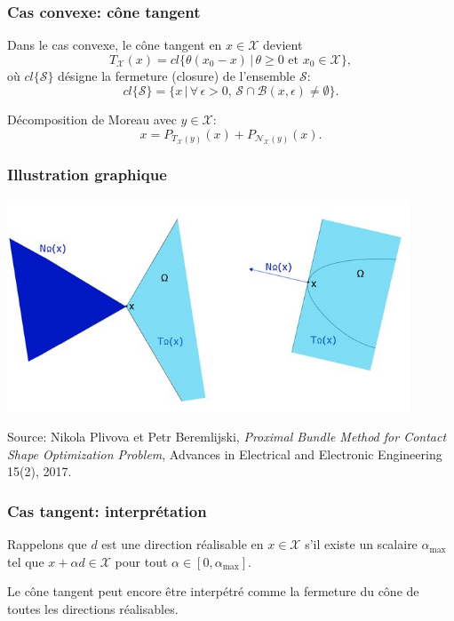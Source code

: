 \documentclass[t,usepdftitle=false]{beamer}
\def\cB{\mathcal{B}}
\def\cN{\mathcal{N}}
\def\cS{\mathcal{S}}
\def\cX{\mathcal{X}}
\begin{document}
\begin{frame}
\frametitle{Cas convexe: cône tangent}

Dans le cas convexe, le cône tangent en $x \in \cX$ devient
$$
T_{\cX}(x) = cl\{ \theta(x_0-x) \,|\, \theta \geq 0 \mbox{ et } x_0 \in \cX \},
$$
où $cl\{\cS\}$ désigne la fermeture (closure) de l'ensemble $\cS$:
$$
cl\{\cS\} = \{ x \,|\, \forall\, \epsilon > 0,\, \cS \cap \cB(x,\epsilon) \ne \emptyset \}.
$$

\mbox{}

Décomposition de Moreau avec $y \in \cX$:
$$
x = P_{T_{\cX}(y)}(x) + P_{\cN_{\cX}(y)}(x).
$$

\end{frame}

\begin{frame}
\frametitle{Illustration graphique}
	
\begin{center}
	\includegraphics[width=0.9\textwidth]{Examples-of-the-tangent-and-normal-cones-of-given-convex-set-O_W640.jpg}
\end{center}
{\footnotesize{Source: Nikola Plivova et Petr Beremlijski, \textit{Proximal Bundle Method for Contact Shape Optimization Problem}, Advances in Electrical and Electronic Engineering 15(2), 2017.}}

\end{frame}

\begin{frame}
\frametitle{Cas tangent: interprétation}

Rappelons que $d$ est une direction réalisable en $x \in \cX$ s'il existe un scalaire $\alpha_{\max}$ tel que $x + \alpha d \in \cX$  pour tout $\alpha \in [0, \alpha_{\max}]$. 

\mbox{}

Le cône tangent peut encore être interpétré comme la fermeture du cône de toutes les directions réalisables.

\end{frame}
\end{document}
